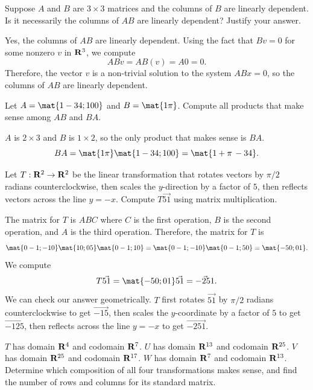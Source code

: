 \begin{problems}
\problem Suppose $A$ and $B$ are $3 \times 3$ matrices and the columns of $B$
are linearly dependent.  Is it necessarily the columns of $AB$ are linearly
dependent?  Justify your answer.

\begin{solution}
  Yes, the columns of $AB$ are linearly dependent.  Using the fact that $Bv=0$
  for some nonzero $v$ in ${\bf R}^3$, we compute \[ABv=AB(v) = A0=0.\]
  Therefore, the vector $v$ is a non-trivial solution to the system $ABx = 0$,
  so the columns of $AB$ are linearly dependent.
\end{solution}

\problem %
Let $A = \mat{1 -3 4; 1 0 0}$ and $B = \mat{1 \pi}$.  Compute all products that
make sense among $AB$ and $BA$.

\begin{solution}
  $A$ is $2 \times 3$ and $B$ is $1 \times 2$, so the only product that makes
  sense is $BA$.
  \[BA = \mat{1 \pi}\mat{1 -3 4; 1 0 0} = \mat{1+\pi \, -3 4}.\]
\end{solution}

\problem %
Let $T: {\bf R}^2 \to {\bf R}^2$ be the linear transformation that rotates
vectors by $\pi/2$ radians counterclockwise, then scales the $y$-direction by a
factor of $5$, then reflects vectors across the line $y = -x$.  Compute
$T\vec{5 1}$ using matrix multiplication.

\begin{solution}
  The matrix for $T$ is $ABC$ where $C$ is the first operation, $B$ is the
  second operation, and $A$ is the third operation.  Therefore, the matrix for
  $T$ is
  \[\mat{0 -1; -1 0}\mat{1 0; 0 5} \mat{0 -1; 1 0}
    = \mat{0 -1; -1 0} \mat{0 -1; 5 0} = \mat{-5 0; 0 1}.\] %
  We compute
  \[T \vec{5 1} = \mat{-5 0; 0 1}\vec{5 1} = \vec{-25 1}.\] We can check our
  answer geometrically.  $T$ first rotates $\vec{5 1}$ by $\pi/2$ radians
  counterclockwise to get $\vec{-1 5}$, then scales the $y$-coordinate by a
  factor of $5$ to get $\vec{-1 25}$, then reflects across the line $y = -x$ to
  get $\vec{-25 1}$.
\end{solution}


\problem %
$T$ has domain ${\bf R}^{4}$ and codomain ${\bf R}^{7}$. \newline %
$U$ has domain ${\bf R}^{13}$ and codomain ${\bf R}^{25}$. \newline %
$V$ has domain ${\bf R}^{25}$ and codomain ${\bf R}^{17}$. \newline %
$W$ has domain ${\bf R}^{7}$ and codomain ${\bf R}^{13}$. \newline %
Determine which composition of all four transformations makes sense, and find
the number of rows and columns for its standard matrix.


\end{problems}

